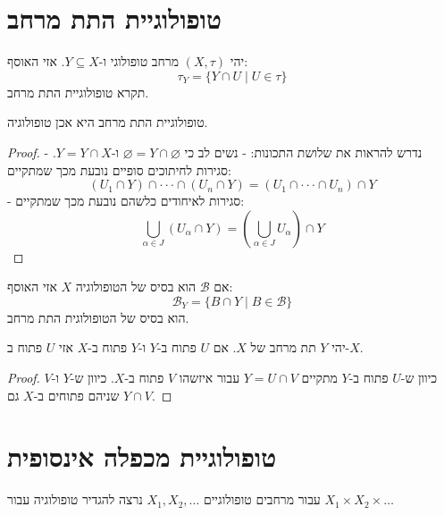 \documentclass{tstextbook}
\begin{document}
\section{טופולוגיית התת מרחב}

\begin{definition}
יהי \((X,\tau)\) מרחב טופולוגי ו-\(Y\subseteq X\). אזי האוסף:
$$\tau_{Y}=\{ Y\cap  U\mid U \in \tau \}$$
תקרא טופולוגיית התת מרחב.

\end{definition}
\begin{lemma}
טופולוגיית התת מרחב היא אכן טופולוגיה.

\end{lemma}
\begin{proof}
נדרש להראות את שלושת התכונות:
- נשים לב כי \(\varnothing=Y\cap \varnothing\) ו-\(Y=Y\cap X\).
- סגירות לחיתוכים סופיים נובעת מכך שמתקיים:
$$(U_{1}\cap Y)\cap\cdot\cdot\cdot\cap(U_{n}\cap Y)=(U_{1}\cap\cdot\cdot\cdot\cap U_{n})\cap Y$$
- סגירות לאיחודים כלשהם נובעת מכך שמתקיים:
$$\bigcup_{\alpha\in J}(U_{\alpha}\cap Y)=(\bigcup_{\alpha\in J}U_{\alpha})\cap Y$$

\end{proof}
\begin{proposition}
אם \(\mathcal{B}\) הוא בסיס של הטופולוגיה \(X\) אזי האוסף:
$$\mathcal{B} _{Y}=\{ B\cap  Y \mid B \in \mathcal{B}  \}$$
הוא בסיס של הטופולוגית התת מרחב.

\end{proposition}
\begin{proposition}
יהי \(Y\) תת מרחב של \(X\). אם \(U\) פתוח ב-\(Y\) ו-\(Y\) פתוח ב-\(X\) אזי \(U\) פתוח ב-\(X\).

\end{proposition}
\begin{proof}
כיוון ש-\(U\) פתוח ב-\(Y\) מתקיים \(Y=U\cap V\) עבור איזשהו \(V\) פתוח ב-\(X\). כיוון ש-\(Y\) ו-\(V\) שניהם פתוחים ב-\(X\) גם \(Y \cap V\).

\end{proof}
\section{טופולוגיית מכפלה אינסופית}

עבור מרחבים טופולוגיים \(X_{1},X_{2},\dots\) נרצה להגדיר טופולוגיה עבור \(X_{1}\times X_{2}\times\dots\)
\end{document}
